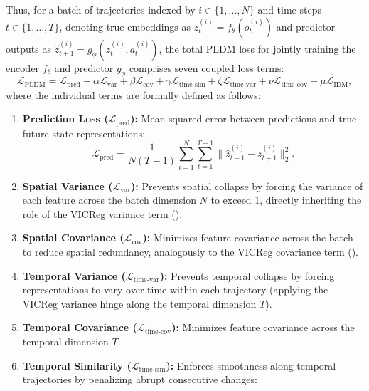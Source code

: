 \documentclass[11pt, oneside, openany]{book}
\begin{document}
Thus, for a batch of trajectories indexed by $i \in \{1, \dots, N\}$ and time steps $t \in \{1, \dots, T\}$, denoting true embeddings as $z_{t}^{(i)} = f_{\theta}(o_{t}^{(i)})$ and predictor outputs as $\hat{z}_{t+1}^{(i)} = g_{\phi}(z_{t}^{(i)}, a_{t}^{(i)})$, the total PLDM loss for jointly training the encoder $f_{\theta}$ and predictor $g_{\phi}$ comprises seven coupled loss terms:
\begin{equation}
\label{eq:6.3}
\mathcal{L}_{\text{PLDM}} = \mathcal{L}_{\text{pred}} + \alpha \mathcal{L}_{\text{var}} + \beta \mathcal{L}_{\text{cov}} + \gamma \mathcal{L}_{\text{time-sim}} + \zeta \mathcal{L}_{\text{time-var}} + \nu \mathcal{L}_{\text{time-cov}} + \mu \mathcal{L}_{\text{IDM}},
\end{equation}
where the individual terms are formally defined as follows:
\begin{enumerate}
    \item \textbf{Prediction Loss ($\mathcal{L}_{\text{pred}}$):} Mean squared error between predictions and true future state representations:
    \begin{equation}
    \label{eq:6.4}
    \mathcal{L}_{\text{pred}} = \frac{1}{N(T - 1)} \sum_{i=1}^{N} \sum_{t=1}^{T-1} \lVert \hat{z}_{t+1}^{(i)} - z_{t+1}^{(i)} \rVert_{2}^{2}.
    \end{equation}
    \item \textbf{Spatial Variance ($\mathcal{L}_{\text{var}}$):} Prevents spatial collapse by forcing the variance of each feature across the batch dimension $N$ to exceed $1$, directly inheriting the role of the VICReg variance term ().
    \item \textbf{Spatial Covariance ($\mathcal{L}_{\text{cov}}$):} Minimizes feature covariance across the batch to reduce spatial redundancy, analogously to the VICReg covariance term ().
    \item \textbf{Temporal Variance ($\mathcal{L}_{\text{time-var}}$):} Prevents temporal collapse by forcing representations to vary over time within each trajectory (applying the VICReg variance hinge along the temporal dimension $T$).
    \item \textbf{Temporal Covariance ($\mathcal{L}_{\text{time-cov}}$):} Minimizes feature covariance across the temporal dimension $T$.
    \item \textbf{Temporal Similarity ($\mathcal{L}_{\text{time-sim}}$):} Enforces smoothness along temporal trajectories by penalizing abrupt consecutive changes:
    \begin{equation}

\end{equation}
\end{enumerate}
\end{document}

